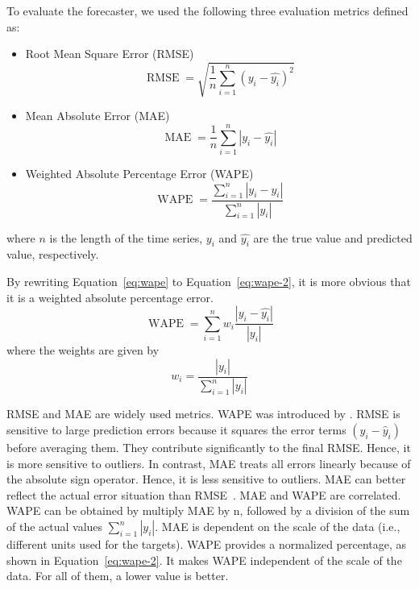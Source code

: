 To evaluate the forecaster, we used the following three evaluation metrics defined as:
\begin{itemize}
    \item Root Mean Square Error (RMSE)
    \begin{equation} 
        \label{eq:rmse}
        \operatorname{RMSE} = \sqrt{\frac{1}{n}\sum_{i=1}^n (y_i-\hat{y_i})^2}
    \end{equation}
    \item Mean Absolute Error (MAE)
    \begin{equation} 
        \label{eq:mae}
        \operatorname{MAE} = \frac{1}{n}\sum_{i=1}^n |y_i-\hat{y_i}|
    \end{equation}
    \item Weighted Absolute Percentage Error (WAPE)
    \begin{equation} 
        \label{eq:wape}
        \operatorname{WAPE} = \frac{\sum_{i=1}^n |y_i-\hat{y_i}|}{\sum_{i=1}^n |y_i|}
    \end{equation}
\end{itemize}
where $n$ is the length of the time series, $y_i$ and $\hat{y_i}$ are the true value and predicted value, respectively.

By rewriting Equation~\ref{eq:wape} to Equation~\ref{eq:wape-2}, it is more obvious that it is a weighted absolute percentage error.
\begin{equation} 
    \label{eq:wape-2}
    \operatorname{WAPE} = \sum_{i=1}^n w_i \frac{|y_i - \hat{y_i}|}{|y_i|}
\end{equation}
where the weights are given by
\begin{equation} 
    w_i = \frac{|y_i|}{\sum_{i=1}^n |y_i|}
\end{equation}

RMSE and MAE are widely used metrics.
WAPE was introduced by \cite{kolassa2007advantages}.
RMSE is sensitive to large prediction errors because it squares the error terms $(y_i - \hat{y}_i)$ before averaging them.
They contribute significantly to the final RMSE.
Hence, it is more sensitive to outliers.
%
In contrast, MAE treats all errors linearly because of the absolute sign operator.
Hence, it is less sensitive to outliers.
MAE can better reflect the actual error situation than RMSE~\cite{li2024deep}.
%
MAE and WAPE are correlated.
WAPE can be obtained by multiply MAE by n, followed by a division of the sum of the actual values $\sum_{i=1}^n |y_i|$.
MAE is dependent on the scale of the data (i.e., different units used for the targets).
WAPE provides a normalized percentage, as shown in Equation~\ref{eq:wape-2}.
It makes WAPE independent of the scale of the data.
%
For all of them, a lower value is better.

